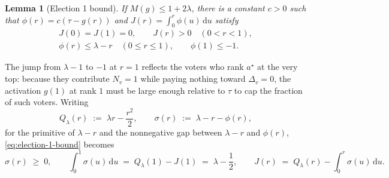 \documentclass[11pt]{article}
\numberwithin{equation}{section}
\theoremstyle{plain}
\newtheorem{lemma}[theorem]{Lemma}
\theoremstyle{definition}
\newcommand{\1}{\mathbf{1}}
\begin{document}
\begin{lemma}[Election 1 bound]
\label{lem:election-1}
If $M(g) \le 1 + 2\lambda$, there is a constant $c > 0$ such that $\phi(r) = c(\tau - g(r))$ and $J(r) = \int_0^r \phi(u)\,\mathrm{d}u$ satisfy
\begin{equation}
  \begin{gathered}
    J(0) = J(1) = 0, \qquad J(r) > 0 \quad (0 < r < 1), \\
    \phi(r) \le \lambda - r \quad (0 \le r \le 1), \qquad \phi(1) \le -1.
  \end{gathered}
  \label{eq:election-1-bound}
\end{equation}
\end{lemma}

The jump from $\lambda - 1$ to $-1$ at $r = 1$ reflects the voters who rank $a^\star$ at the very top: because they contribute $N_v = 1$ while paying nothing toward $\Delta_v = 0$, the activation $g(1)$ at rank $1$ must be large enough relative to $\tau$ to cap the fraction of such voters. Writing
\[
  Q_\lambda(r) \;:=\; \lambda r - \frac{r^2}{2},
  \qquad
  \sigma(r) \;:=\; \lambda - r - \phi(r),
\]
for the primitive of $\lambda - r$ and the nonnegative gap between $\lambda - r$ and $\phi(r)$, \cref{eq:election-1-bound} becomes
\begin{equation}
  \sigma(r) \;\ge\; 0,
  \qquad
  \int_0^1 \sigma(u)\,\mathrm{d}u \;=\; Q_\lambda(1) - J(1) \;=\; \lambda - \frac{1}{2},
  \qquad
  J(r) \;=\; Q_\lambda(r) - \int_0^r \sigma(u)\,\mathrm{d}u.
  \label{eq:sigma-relations}
\end{equation}
\end{document}
